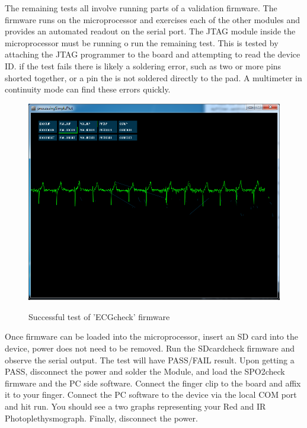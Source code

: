 The remaining tests all involve running parts of a validation firmware. The firmware runs on the microprocessor and exercises each of the other modules and provides an automated readout on the serial port. The JTAG module inside the microprocessor must be running o run the remaining test. This is tested by attaching the JTAG programmer to the board and attempting to read the device ID. if the test fails there is likely a soldering error, such as two or more pins shorted together, or a pin the is not soldered directly to the pad. A multimeter in continuity mode can find these errors quickly. 

\begin{figure}[ht]
\begin{center}
	\label{fig:ECG_Test_Pass}
	\includegraphics[angle=0,scale=1,width=1\textwidth]{Images/ECG_processingSketch.png} 
	\caption{Successful test of 'ECGcheck' firmware}
\end{center}
\end{figure}

Once firmware can be loaded into the microprocessor, insert an SD card into the device, power does not need to be removed. Run the SDcardcheck firmware and observe the serial output. The test will have PASS/FAIL result. Upon getting a PASS, disconnect the power and solder the  Module, and load the SPO2check firmware and the PC side software. Connect the finger clip to the board and affix it to your finger. Connect the PC software to the device via the local COM port and hit run. You should see a two graphs representing your Red and IR Photoplethysmograph. Finally, disconnect the power.


